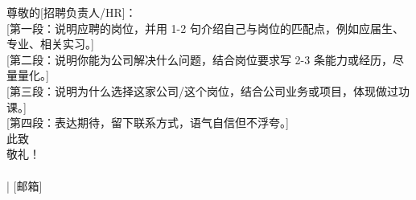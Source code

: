 \documentclass[11pt,a4paper]{article}
\begin{document}
\noindent 尊敬的[招聘负责人/HR]：\\[1.2em]

[第一段：说明应聘的岗位，并用 1-2 句介绍自己与岗位的匹配点，例如应届生、专业、相关实习。]\\[1em]

[第二段：说明你能为公司解决什么问题，结合岗位要求写 2-3 条能力或经历，尽量量化。]\\[1em]

[第三段：说明为什么选择这家公司/这个岗位，结合公司业务或项目，体现做过功课。]\\[1em]

[第四段：表达期待，留下联系方式，语气自信但不浮夸。]\\[1.2em]

\noindent 此致\\[0.5em]
敬礼！\\[3em]

\noindent [姓名]\\
[手机号] | [邮箱]\\
[日期]
\end{document}
